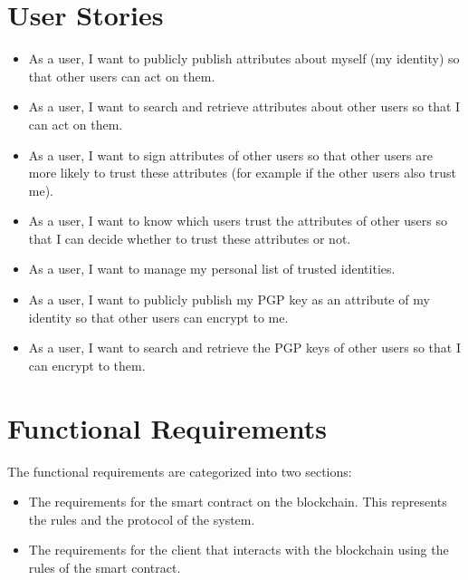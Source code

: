 \documentclass[a4paper]{report}
\begin{document}
	\section{User Stories}
	\begin{itemize}
		\item As a user, I want to publicly publish attributes about myself (my identity) so that other users can act on them.
		\item As a user, I want to search and retrieve attributes about other users so that I can act on them.
		\item As a user, I want to sign attributes of other users so that other users are more likely to trust these attributes (for example if the other users also trust me).
		\item As a user, I want to know which users trust the attributes of other users so that I can decide whether to trust these attributes or not.
		\item As a user, I want to manage my personal list of trusted identities.
		\item As a user, I want to publicly publish my PGP key as an attribute of my identity so that other users can encrypt to me.
		\item As a user, I want to search and retrieve the PGP keys of other users so that I can encrypt to them.
	\end{itemize}
	
	\section{Functional Requirements}
	The functional requirements are categorized into two sections:
	\begin{itemize}
		\item The requirements for the smart contract on the blockchain. This represents the rules and the protocol of the system.
		\item The requirements for the client that interacts with the blockchain using the rules of the smart contract.
	\end{itemize}		
	
\end{document}
